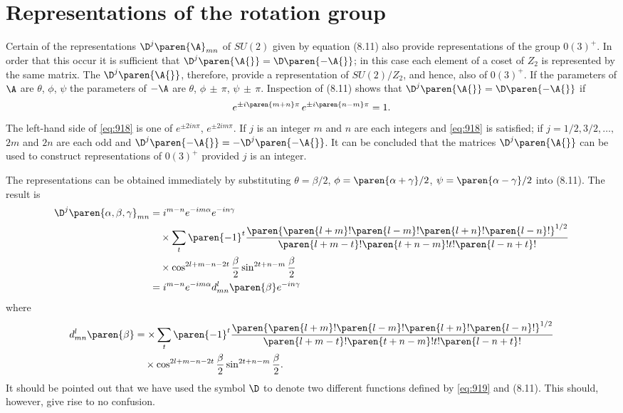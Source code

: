 \section{Representations of the rotation group}

Certain of the representations $\D^{j}\paren{\A}_{mn}$ of $SU(2)$ given by equation (8.11) also provide representations of the group $0(3)^{+}$. In order that this occur it is sufficient that $\D^{j}\paren{\A{}} = \D\paren{-\A{}}$; in this case each element of a coset of $Z_{2}$ is represented by the same matrix. The $\D^{j}\paren{\A{}}$, therefore, provide a representation of $SU(2) / Z_{2}$, and hence, also of $0(3)^{+}$. If the parameters of $\A$ are $\theta$, $\phi$, $\psi$ the parameters of $-\A$ are $\theta$, $\phi \, \pm \, \pi$, $\psi \, \pm \, \pi$.	Inspection of (8.11) shows that $\D^{j}\paren{\A{}} = \D\paren{-\A{}}$ if
\begin{equation}
  e^{\pm i \paren{m + n} \pi} \, e^{\pm i \paren{n - m} \pi } = 1 .
  \label{eq:918}
\end{equation}
The left-hand side of \eqref{eq:918} is one of $e^{\pm 2 i n \pi}$, $e^{\pm 2 i m \pi}$.	If $j$ is an integer $m$ and $n$ are each integers and \eqref{eq:918} is satisfied; if $j = 1/2, 3/2, \dots,$
$2m$ and $2n$ are each odd and $\D^{j}\paren{-\A{}} = -\D^{j}\paren{-\A{}}$. It can be concluded that the matrices $\D^{j}\paren{\A{}}$ can be used to construct representations of $0(3)^{+}$ provided $j$ is an integer.

The representations can be obtained immediately by substituting $\theta = \beta / 2$, $\phi = \paren{\alpha + \gamma } / 2$, $\psi = \paren{\alpha - \gamma} / 2$ into (8.11). The result is
\begin{equation}
  \begin{split}
    \D^{j}\paren{\alpha, \beta, \gamma}_{mn} 
      &= i^{m-n} e^{-im\alpha} e^{-in\gamma} \\
      &\quad \times \sum_{t} \paren{-1}^{t} 
       \frac{ \paren{ \paren{l+m}! \paren{l-m}! \paren{l+n}! \paren{l-n}! }^{1/2} }
            { \paren{l+m-t}! \paren{t+n-m}! t! \paren{l-n+t}! } \\
      &\quad \times \cos^{2l+m-n-2t} \frac{\beta} {2} \sin^{2t+n-m} \frac{\beta} {2} \\
      &= i^{m-n} e^{-im\alpha} d^{l}_{mn} \paren{\beta} e^{-in\gamma} 
  \end{split}
  \label{eq:919}
\end{equation}
where
\begin{equation}
  \begin{split}
    d^{l}_{mn} \paren{\beta} 
      &= \times \sum_{t} \paren{-1}^{t} 
       \frac{ \paren{ \paren{l+m}! \paren{l-m}! \paren{l+n}! \paren{l-n}! }^{1/2} }
            { \paren{l+m-t}! \paren{t+n-m}! t! \paren{l-n+t}! } \\
      &\quad \times \cos^{2l+m-n-2t} \frac{\beta} {2} \sin^{2t+n-m} \frac{\beta} {2} .
  \end{split}
\end{equation}
It should be pointed out that we have used the symbol $\D$ to denote two different functions defined by \eqref{eq:919} and (8.11). This should, however, give rise to no confusion.

